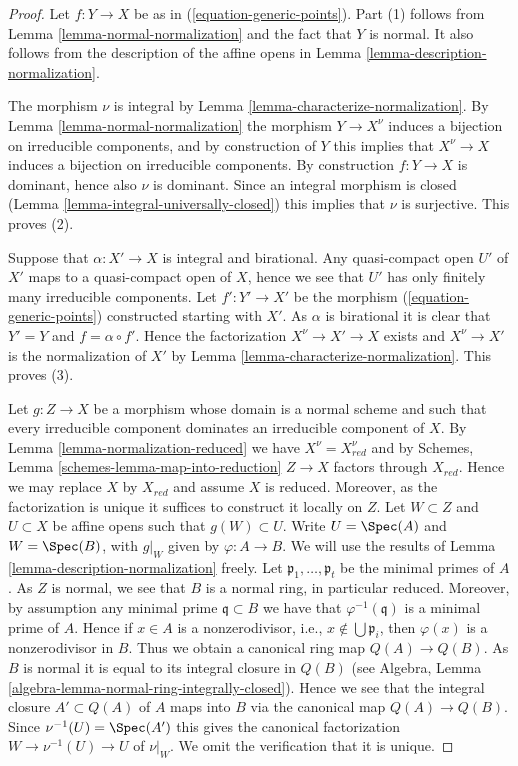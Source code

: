 \begin{proof}
Let $f : Y \to X$ be as in (\ref{equation-generic-points}).
Part (1) follows from Lemma \ref{lemma-normal-normalization}
and the fact that $Y$ is normal. It also follows from the description
of the affine opens in Lemma \ref{lemma-description-normalization}.

\medskip\noindent
The morphism $\nu$ is integral by Lemma \ref{lemma-characterize-normalization}.
By Lemma \ref{lemma-normal-normalization} the
morphism $Y \to X^\nu$ induces a bijection on irreducible components,
and by construction of $Y$ this implies that $X^\nu \to X$ induces
a bijection on irreducible components. By construction $f : Y \to X$
is dominant, hence also $\nu$ is dominant. Since an integral morphism is
closed (Lemma \ref{lemma-integral-universally-closed}) this implies that
$\nu$ is surjective. This proves (2).

\medskip\noindent
Suppose that $\alpha : X' \to X$ is integral and birational.
Any quasi-compact open $U'$ of $X'$ maps to a quasi-compact open
of $X$, hence we see that $U'$ has only finitely many irreducible
components. Let $f' : Y' \to X'$ be the morphism
(\ref{equation-generic-points}) constructed starting with $X'$.
As $\alpha$ is birational
it is clear that $Y' = Y$ and $f = \alpha \circ f'$. Hence
the factorization $X^\nu \to X' \to X$ exists
and $X^\nu \to X'$ is the normalization of $X'$ by
Lemma \ref{lemma-characterize-normalization}. This proves (3).

\medskip\noindent
Let $g : Z \to X$ be a morphism whose domain is a normal scheme
and such that every irreducible component dominates an irreducible
component of $X$. By Lemma \ref{lemma-normalization-reduced}
we have $X^\nu = X_{red}^\nu$ and by
Schemes, Lemma \ref{schemes-lemma-map-into-reduction}
$Z \to X$ factors through $X_{red}$. Hence we may replace $X$ by
$X_{red}$ and assume $X$ is reduced. Moreover, as the factorization
is unique it suffices to construct it locally on $Z$.
Let $W \subset Z$ and $U \subset X$ be affine opens
such that $g(W) \subset U$. Write $U = \Spec(A)$ and
$W = \Spec(B)$, with $g|_W$ given by $\varphi : A \to B$.
We will use the results of Lemma \ref{lemma-description-normalization} freely.
Let $\mathfrak p_1, \ldots, \mathfrak p_t$ be the minimal primes of $A$.
As $Z$ is normal, we see that $B$ is a normal
ring, in particular reduced. Moreover, by assumption any minimal
prime $\mathfrak q \subset B$ we have that $\varphi^{-1}(\mathfrak q)$
is a minimal prime of $A$. Hence if $x \in A$ is a nonzerodivisor, i.e.,
$x \not \in \bigcup \mathfrak p_i$, then $\varphi(x)$ is a nonzerodivisor
in $B$. Thus we obtain a canonical ring map $Q(A) \to Q(B)$. As $B$ is
normal it is equal to its integral closure in $Q(B)$ (see
Algebra, Lemma \ref{algebra-lemma-normal-ring-integrally-closed}).
Hence we see that the integral closure $A' \subset Q(A)$ of $A$
maps into $B$ via the canonical map $Q(A) \to Q(B)$.
Since $\nu^{-1}(U) = \Spec(A')$ this gives the canonical
factorization $W \to \nu^{-1}(U) \to U$ of $\nu|_W$.
We omit the verification that it is unique.
\end{proof}

